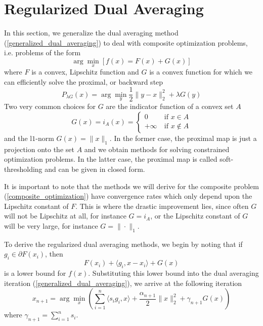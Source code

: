 \section{Regularized Dual Averaging}
In this section, we generalize the dual averaging method (\ref{generalized_dual_averaging}) to deal
with composite optimization problems, i.e. problems of the form
\begin{equation}\label{composite_optimization}
\arg\min_x \left[f(x) = F(x) + G(x)\right] 
\end{equation}
where $F$ is a convex, Lipschitz function and $G$ is a convex function for which we can efficiently solve the proximal,
or backward step
\begin{equation}\label{prox_regularlized_dual_averaging}
 P_{\lambda G}(x) = \arg\min_{y} \frac{1}{2}\|y - x\|_2^2 + \lambda G(y)
\end{equation}
Two very common choices for $G$ are the indicator function of a convex set $A$
\begin{equation}
 G(x) = i_A(x) = 
 \begin{cases}
                    0 &~ \text{if $x\in A$} \\
		    +\infty &~ \text{if $x\notin A$}
 \end{cases}
\end{equation}
and the l$1$-norm $G(x) = \|x\|_1$. In the former case, the proximal map is just a projection onto the set $A$ and
we obtain methods for solving constrained optimization problems. In the latter case, the
proximal map is called soft-thresholding and can be given in closed form.

It is important to note that the methods we will derive for the composite problem (\ref{composite_optimization})
have convergence rates which only depend upon the Lipschitz constant of $F$. This is where the drastic improvement
lies, since often $G$ will not be Lipschitz at all, for instance $G = i_A$, or the Lipschitz constant of $G$ 
will be very large, for instance $G = \|\cdot\|_1$.

To derive the regularized dual averaging methods, we begin by noting that if $g_i\in \partial F(x_i)$, then
$$ F(x_i) + \langle g_i, x - x_i\rangle + G(x)
$$
is a lower bound for $f(x)$. Substituting this lower bound into the dual averaging iteration (\ref{generalized_dual_averaging}),
we arrive at the following iteration
\begin{equation}\label{naive_regularized_dual_averaging}
 x_{n+1} = \arg\min_x \left(\displaystyle\sum_{i = 1}^n \langle s_ig_i, x\rangle + \frac{\alpha_{n+1}}{2}\|x\|_2^2 + \gamma_{n+1} G(x)\right)
\end{equation}
where $\gamma_{n + 1} = \sum_{i = 1}^n s_i$.

